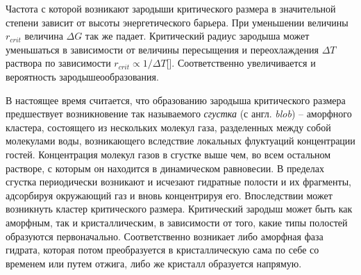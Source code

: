 Частота с которой возникают зародыши критического размера в значительной степени зависит от высоты энергетического барьера. При уменьшении величины $r_{crit}$ величина $\Delta G$ так же падает. Критический радиус зародыша может уменьшаться в зависимости от величины пересыщения и переохлаждения $\Delta T$ раствора по зависимости $r_{crit} \propto 1/\Delta T$[]. Соответственно увеличивается и вероятность зародышеообразования. 

В настоящее время считается, что образованию зародыша критического размера предшествует возникновение так называемого \textit{сгустка} (с англ. \textit{blob}) -- аморфного кластера, состоящего из нескольких молекул газа, разделенных между собой молекулами воды, возникающего вследствие локальных флуктуаций концентрации гостей. Концентрация молекул газов в сгустке выше чем, во всем остальном растворе, с которым он находится в динамическом равновесии. В пределах сгустка периодически возникают и исчезают гидратные полости и их фрагменты, адсорбируя окружающий газ и вновь концентрируя его. Впоследствии может возникнуть кластер критического размера. Критический зародыш может быть как аморфным, так и кристаллическим, в зависимости от того, какие типы полостей образуются первоначально. Соответственно возникает либо аморфная фаза гидрата, которая потом преобразуется в кристаллическую сама по себе со временем или путем отжига, либо же кристалл образуется напрямую.